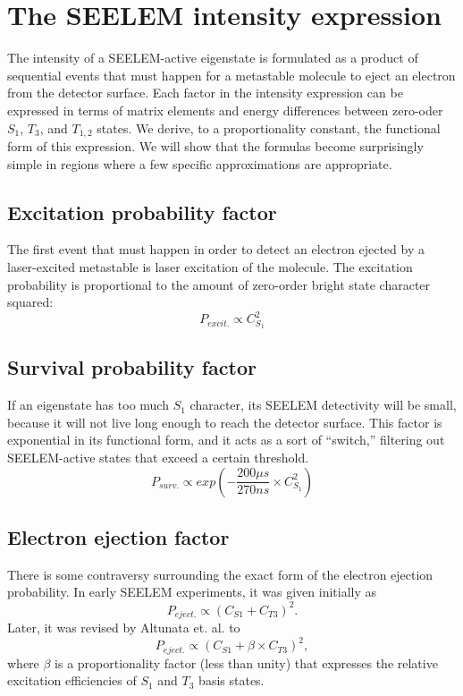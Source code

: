 \documentclass{article}
\begin{document}
\section{The SEELEM intensity expression}

The intensity of a SEELEM-active eigenstate is formulated as a product
of sequential events that must happen for a metastable molecule to
eject an electron from the detector surface. Each factor in the
intensity expression can be expressed in terms of matrix elements and
energy differences between zero-oder $S_1$, $T_3$, and $T_{1,2}$
states. We derive, to a proportionality constant, the functional form
of this expression. We will show that the formulas become surprisingly
simple in regions where a few specific approximations are appropriate.

\subsection{Excitation probability factor}

The first event that must happen in order to detect an electron
ejected by a laser-excited metastable is laser excitation of the
molecule. The excitation probability is proportional to the amount of
zero-order bright state character squared:
\begin{equation}
P_{excit.} \propto C_{S_1}^2
\end{equation}


\subsection{Survival probability factor}

If an eigenstate has too much $S_1$ character, its SEELEM detectivity
will be small, because it will not live long enough to reach the
detector surface. This factor is exponential in its functional form,
and it acts as a sort of ``switch,'' filtering out SEELEM-active
states that exceed a certain threshold.
\begin{equation}
P_{surv.} \propto exp \left( -\frac{200 \mu s}{270 ns} \times C_{S_1}^2 \right)
\end{equation}

\subsection{Electron ejection factor}

There is some contraversy surrounding the exact form of the electron
ejection probability. In early SEELEM experiments, it was given
initially as
\begin{equation}
P_{eject.} \propto (C_{S1} + C_{T3})^2 .
\end{equation}
Later, it was revised by Altunata et. al. to
\begin{equation}
P_{eject.} \propto (C_{S1} + \beta \times C_{T3})^2 ,
\end{equation}
where $\beta$ is a proportionality factor (less than unity) that
expresses the relative excitation efficiencies of $S_1$ and $T_3$
basis states.
\end{document}
